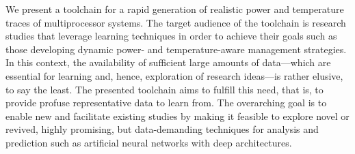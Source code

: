 We present a toolchain for a rapid generation of realistic power and temperature
traces of multiprocessor systems. The target audience of the toolchain is
research studies that leverage learning techniques in order to achieve their
goals such as those developing dynamic power- and temperature-aware management
strategies. In this context, the availability of sufficient large amounts of
data---which are essential for learning and, hence, exploration of research
ideas---is rather elusive, to say the least. The presented toolchain aims to
fulfill this need, that is, to provide profuse representative data to learn
from. The overarching goal is to enable new and facilitate existing studies by
making it feasible to explore novel or revived, highly promising, but
data-demanding techniques for analysis and prediction such as artificial neural
networks with deep architectures.
